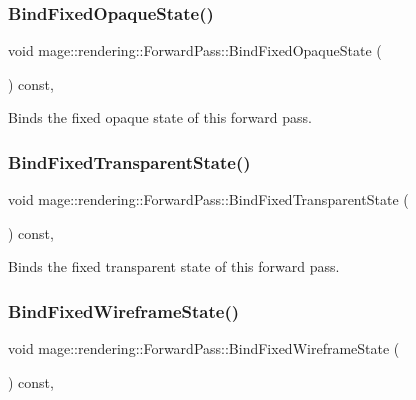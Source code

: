 \subsubsection{\texorpdfstring{Bind\+Fixed\+Opaque\+State()}{BindFixedOpaqueState()}}
{\footnotesize\ttfamily void mage\+::rendering\+::\+Forward\+Pass\+::\+Bind\+Fixed\+Opaque\+State (\begin{DoxyParamCaption}{ }\end{DoxyParamCaption}) const\hspace{0.3cm}{\ttfamily [private]}, {\ttfamily [noexcept]}}

Binds the fixed opaque state of this forward pass. \hypertarget{classmage_1_1rendering_1_1_forward_pass_aefd3217115558f90b92a1521adfb8bb8}{}\label{classmage_1_1rendering_1_1_forward_pass_aefd3217115558f90b92a1521adfb8bb8} 
\subsubsection{\texorpdfstring{Bind\+Fixed\+Transparent\+State()}{BindFixedTransparentState()}}
{\footnotesize\ttfamily void mage\+::rendering\+::\+Forward\+Pass\+::\+Bind\+Fixed\+Transparent\+State (\begin{DoxyParamCaption}{ }\end{DoxyParamCaption}) const\hspace{0.3cm}{\ttfamily [private]}, {\ttfamily [noexcept]}}

Binds the fixed transparent state of this forward pass. \hypertarget{classmage_1_1rendering_1_1_forward_pass_a1d5c1efa0b532674124a264f61f75a07}{}\label{classmage_1_1rendering_1_1_forward_pass_a1d5c1efa0b532674124a264f61f75a07} 
\subsubsection{\texorpdfstring{Bind\+Fixed\+Wireframe\+State()}{BindFixedWireframeState()}}
{\footnotesize\ttfamily void mage\+::rendering\+::\+Forward\+Pass\+::\+Bind\+Fixed\+Wireframe\+State (\begin{DoxyParamCaption}{ }\end{DoxyParamCaption}) const\hspace{0.3cm}{\ttfamily [private]}, {\ttfamily [noexcept]}}

